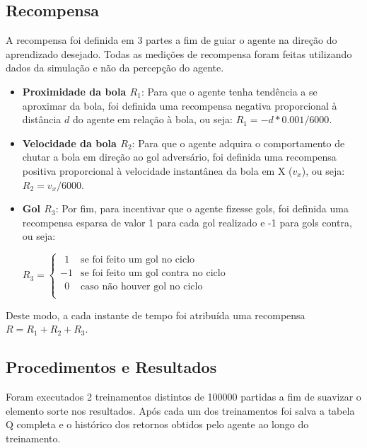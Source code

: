 \subsection{Recompensa}

A recompensa foi definida em 3 partes a fim de guiar o agente na direção do aprendizado desejado. Todas as medições de recompensa foram feitas utilizando dados da simulação e não da percepção do agente.

\begin{itemize}
    \item \textbf{Proximidade da bola $R_1$}: Para que o agente tenha tendência a se aproximar da bola, foi definida uma recompensa negativa proporcional à distância $d$ do agente em relação à bola, ou seja: $R_1 = -d*0.001/6000$.

    \item \textbf{Velocidade da bola $R_2$}: Para que o agente adquira o comportamento de chutar a bola em direção ao gol adversário, foi definida uma recompensa positiva proporcional à velocidade instantânea da bola em X ($v_x$), ou seja: $R_2 = v_x/6000$.
    
    \item \textbf{Gol $R_3$}: Por fim, para incentivar que o agente fizesse gols, foi definida uma recompensa esparsa de valor 1 para cada gol realizado e -1 para gols contra, ou seja:
    
    $
    R_3 =
    \left\{
        \begin{array}{ll}
        \ \ 1  & \mbox{se foi feito um gol no ciclo} \\
         -1  & \mbox{se foi feito um gol contra no ciclo} \\
        \ \ 0  & \mbox{caso não houver gol no ciclo} \\
        \end{array}
    \right.
    $
\end{itemize}

Deste modo, a cada instante de tempo foi atribuída uma recompensa $R = R_1 + R_2 + R_3$.

\subsection{Procedimentos e Resultados}

Foram executados 2 treinamentos distintos de 100000 partidas a fim de suavizar o elemento sorte nos resultados. Após cada um dos treinamentos foi salva a tabela Q completa e o histórico dos retornos obtidos pelo agente ao longo do treinamento.

